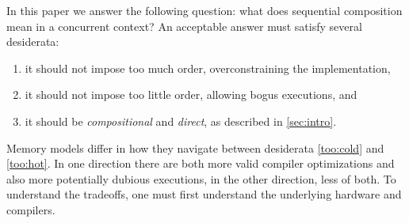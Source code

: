 In this paper we answer the following question: what does sequential
composition mean in a concurrent context?  An acceptable answer must satisfy
several desiderata:
\begin{enumerate}
\item\label{too:cold} it should not impose too much order, overconstraining the implementation,
\item\label{too:hot} it should not impose too little order, allowing bogus executions, and
\item it should be \emph{compositional} and \emph{direct}, as described in \textsection\ref{sec:intro}.
\end{enumerate}
Memory models differ in how they navigate between desiderata \ref{too:cold}
and \ref{too:hot}.  In one direction there are both more valid compiler
optimizations and also more potentially dubious executions, in the other
direction, less of both.  To understand the tradeoffs, one must first
understand the underlying hardware and compilers.
%







